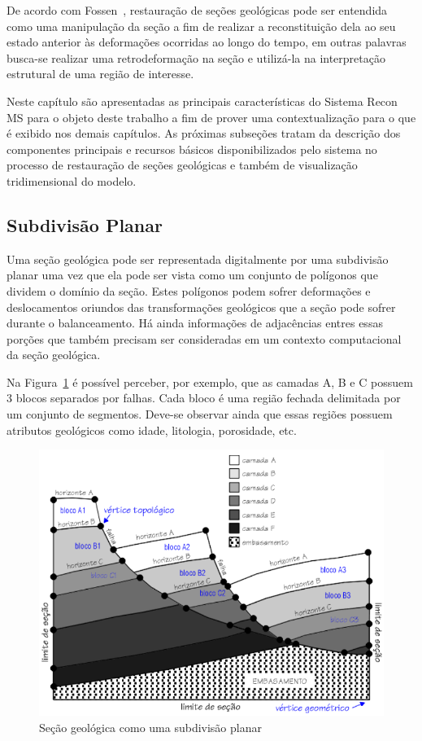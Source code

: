 De acordo com Fossen~\cite{Fossen}, restauração de seções geológicas pode ser entendida como uma manipulação da seção a fim de realizar a reconstituição dela ao seu estado anterior às deformações ocorridas ao longo do tempo, em outras palavras busca-se realizar uma retrodeformação na seção e utilizá-la na interpretação estrutural de uma região de interesse.

Neste capítulo são apresentadas as principais características do Sistema Recon MS para o objeto deste trabalho a fim de prover uma contextualização para o que é exibido nos demais capítulos. As próximas subseções tratam da descrição dos componentes principais e recursos básicos disponibilizados pelo sistema no processo de restauração de seções geológicas e também de visualização tridimensional do modelo. 

\subsection{Subdivisão Planar} %

Uma seção geológica pode ser representada digitalmente por uma subdivisão planar uma vez que ela pode ser vista como um conjunto de polígonos que dividem o domínio da seção. Estes polígonos podem sofrer deformações e deslocamentos oriundos das transformações geológicos que a seção pode sofrer durante o balanceamento. Há ainda informações de adjacências entres essas porções que também precisam ser consideradas em um contexto computacional da seção geológica.

Na Figura~\ref{fig-subdivisao-planar} é possível perceber, por exemplo, que as camadas A, B e C possuem 3 blocos separados por falhas. Cada bloco é uma região fechada delimitada por um conjunto de segmentos. Deve-se observar ainda que essas regiões possuem atributos geológicos como idade, litologia, porosidade, etc.

\begin{figure} [h]
  \begin{center}
    \includegraphics[width=\textwidth]{images/fig-subdivisao-planar}
    \caption{Seção geológica como uma subdivisão planar~\cite{Ferraz}}\label{fig-subdivisao-planar}
  \end{center}
\end{figure}

